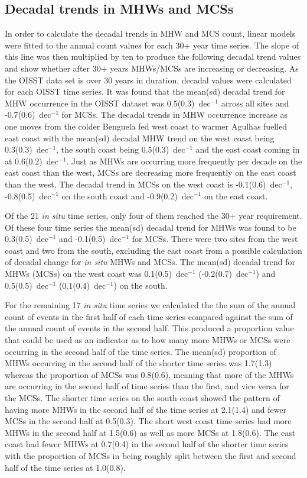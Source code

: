 \documentclass[a4paper,10pt,review]{elsarticle}
\begin{document}
\subsection{Decadal trends in MHWs and MCSs}
In order to calculate the decadal trends in MHW and MCS count, linear models were fitted to the annual count values for each 30+ year time series. The slope of this line was then multiplied by ten to produce the following decadal trend values and show whether after 30+ years MHWs/MCSs are increasing or decreasing. As the OISST data set is over 30 years in duration, decadal values were calculated for each OISST time series. It was found that the mean(sd) decadal trend for MHW occurrence in the OISST dataset was 0.5(0.3)~dec$^{-1}$ across all sites and -0.7(0.6)~dec$^{-1}$ for MCSs. The decadal trends in MHW occurrence increase as one moves from the colder Benguela fed west coast to warmer Agulhas fuelled east coast with the mean(sd) decadal MHW trend on the west coast being 0.3(0.3)~dec$^{-1}$, the south coast being 0.5(0.3)~dec$^{-1}$ and the east coast coming in at 0.6(0.2)~dec$^{-1}$. Just as MHWs are occurring more frequently per decade on the east coast than the west, MCSs are decreasing more frequently on the east coast than the west. The decadal trend in MCSs on the west coast is -0.1(0.6)~dec$^{-1}$, -0.8(0.5)~dec$^{-1}$ on the south coast and -0.9(0.2)~dec$^{-1}$ on the east coast.

Of the 21 \emph{in situ} time series, only four of them reached the 30+ year requirement. Of these four time series the mean(sd) decadal trend for MHWs was found to be 0.3(0.5)~dec$^{-1}$ and -0.1(0.5)~dec$^{-1}$ for MCSs. There were two sites from the west coast and two from the south, excluding the east coast from a possible calculation of decadal change for \emph{in situ} MHWs and MCSs. The mean(sd) decadal trend for MHWs (MCSs) on the west coast was 0.1(0.5)~dec$^{-1}$ (-0.2(0.7)~dec$^{-1}$) and 0.5(0.5)~dec$^{-1}$ (0.1(0.4)~dec$^{-1}$) on the south.

For the remaining 17 \emph{in situ} time series we calculated the the sum of the annual count of events in the first half of each time series compared against the sum of the annual count of events in the second half. This produced a proportion value that could be used as an indicator as to how many more MHWs or MCSs were occurring in the second half of the time series. The mean(sd) proportion of MHWs occurring in the second half of the shorter time series was 1.7(1.3) whereas the proportion of MCSs was 0.8(0.6), meaning that more of the MHWs are occurring in the second half of time series than the first, and vice versa for the MCSs. The shorter time series on the south coast showed the pattern of having more MHWs in the second half of the time series at 2.1(1.4) and fewer MCSs in the second half at 0.5(0.3). The short west coast time series had more MHWs in the second half at 1.5(0.6) as well as more MCSs at 1.8(0.6). The east coast had fewer MHWs at 0.7(0.4) in the second half of the shorter time series with the proportion of MCSs in being roughly split between the first and second half of the time series at 1.0(0.8).
\end{document}
